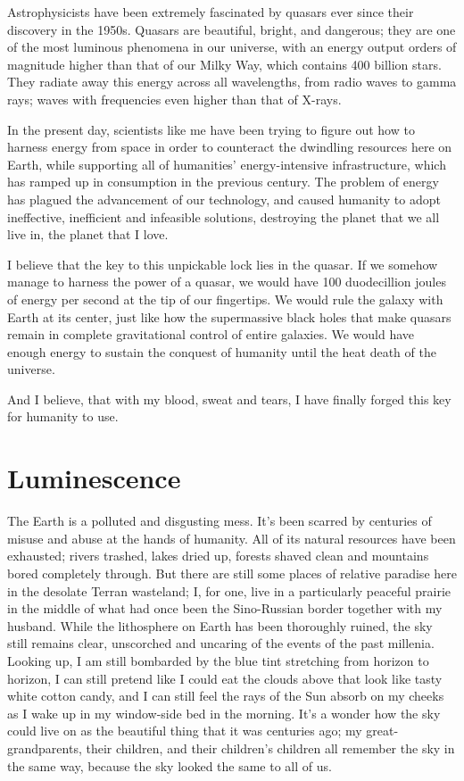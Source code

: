 \documentclass{book}
\begin{document}
			Astrophysicists have been extremely fascinated by quasars ever since their discovery in
			the 1950s. Quasars are beautiful, bright, and dangerous; they are one of the most
			luminous phenomena in our universe, with an energy output orders of magnitude higher
			than that of our Milky Way, which contains 400 billion stars. They radiate away this
			energy across all wavelengths, from radio waves to gamma rays; waves with frequencies
			even higher than that of X-rays.

			In the present day, scientists like me have been trying to figure out how to harness
			energy from space in order to counteract the dwindling resources here on Earth, while
			supporting all of humanities' energy-intensive infrastructure, which has ramped up in
			consumption in the previous century. The problem of energy has plagued the advancement
			of our technology, and caused humanity to adopt ineffective, inefficient and infeasible
			solutions, destroying the planet that we all live in, the planet that I love.

			I believe that the key to this unpickable lock lies in the quasar. If we somehow manage
			to harness the power of a quasar, we would have 100 duodecillion joules of energy per
			second at the tip of our fingertips. We would rule the galaxy with Earth at its center,
			just like how the supermassive black holes that make quasars remain in complete
			gravitational control of entire galaxies. We would have enough energy to sustain the
			conquest of humanity until the heat death of the universe.

			And I believe, that with my blood, sweat and tears, I have finally forged this key for
			humanity to use.



		\chapter{Luminescence}
			The Earth is a polluted and disgusting mess. It's been scarred by centuries of misuse
			and abuse at the hands of humanity. All of its natural resources have been exhausted;
			rivers trashed, lakes dried up, forests shaved clean and mountains bored completely
			through. But there are still some places of relative paradise here in the desolate
			Terran wasteland; I, for one, live in a particularly peaceful prairie in the middle of
			what had once been the Sino-Russian border together with my husband. While the
			lithosphere on Earth has been thoroughly ruined, the sky still remains clear,
			unscorched and uncaring of the events of the past millenia. Looking up, I am still
			bombarded by the blue tint stretching from horizon to horizon, I can still pretend like
			I could eat the clouds above that look like tasty white cotton candy, and I can still
			feel the rays of the Sun absorb on my cheeks as I wake up in my window-side bed in the
			morning. It's a wonder how the sky could live on as the beautiful thing that it was
			centuries ago; my great-grandparents, their children, and their children's children all
			remember the sky in the same way, because the sky looked the same to all of us.
\end{document}
